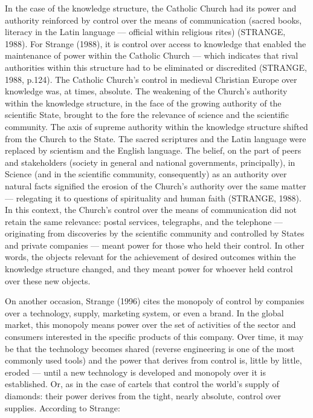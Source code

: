 In the case of the knowledge structure, the Catholic Church had its power and authority reinforced by control over the means of communication (sacred books, literacy in the Latin language --- official within religious rites) (STRANGE, 1988). For Strange (1988), it is control over access to knowledge that enabled the maintenance of power within the Catholic Church --- which indicates that rival authorities within this structure had to be eliminated or discredited (STRANGE, 1988, p.124). The Catholic Church's control in medieval Christian Europe over knowledge was, at times, absolute. The weakening of the Church's authority within the knowledge structure, in the face of the growing authority of the scientific State, brought to the fore the relevance of science and the scientific community. The axis of supreme authority within the knowledge structure shifted from the Church to the State. The sacred scriptures and the Latin language were replaced by scientism and the English language. The belief, on the part of peers and stakeholders (society in general and national governments, principally), in Science (and in the scientific community, consequently) as an authority over natural facts signified the erosion of the Church's authority over the same matter --- relegating it to questions of spirituality and human faith (STRANGE, 1988). In this context, the Church's control over the means of communication did not retain the same relevance: postal services, telegraphs, and the telephone --- originating from discoveries by the scientific community and controlled by States and private companies --- meant power for those who held their control. In other words, the objects relevant for the achievement of desired outcomes within the knowledge structure changed, and they meant power for whoever held control over these new objects.

On another occasion, Strange (1996) cites the monopoly of control by companies over a technology, supply, marketing system, or even a brand. In the global market, this monopoly means power over the set of activities of the sector and consumers interested in the specific products of this company. Over time, it may be that the technology becomes shared (reverse engineering is one of the most commonly used tools) and the power that derives from control is, little by little, eroded --- until a new technology is developed and monopoly over it is established. Or, as in the case of cartels that control the world's supply of diamonds: their power derives from the tight, nearly absolute, control over supplies. According to Strange:

